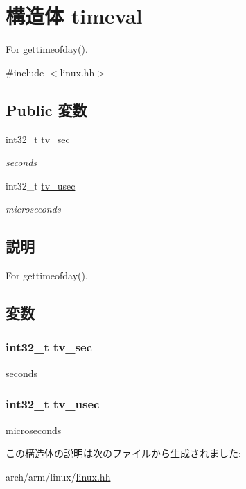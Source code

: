 \hypertarget{structArmLinux32_1_1timeval}{
\section{構造体 timeval}
\label{structArmLinux32_1_1timeval}
}


For gettimeofday().  


{\ttfamily \#include $<$linux.hh$>$}\subsection*{Public 変数}
\begin{DoxyCompactItemize}
\item 
int32\_\-t \hyperlink{structArmLinux32_1_1timeval_a5a0c36f083f4bea01cfe2f60602d30b7}{tv\_\-sec}
\begin{DoxyCompactList}\small\item\em seconds \item\end{DoxyCompactList}\item 
int32\_\-t \hyperlink{structArmLinux32_1_1timeval_a78b854e092076109527b4befb66677a3}{tv\_\-usec}
\begin{DoxyCompactList}\small\item\em microseconds \item\end{DoxyCompactList}\end{DoxyCompactItemize}


\subsection{説明}
For gettimeofday(). 

\subsection{変数}
\hypertarget{structArmLinux32_1_1timeval_a5a0c36f083f4bea01cfe2f60602d30b7}{
\subsubsection[{tv\_\-sec}]{\setlength{\rightskip}{0pt plus 5cm}int32\_\-t {\bf tv\_\-sec}}}
\label{structArmLinux32_1_1timeval_a5a0c36f083f4bea01cfe2f60602d30b7}


seconds \hypertarget{structArmLinux32_1_1timeval_a78b854e092076109527b4befb66677a3}{
\subsubsection[{tv\_\-usec}]{\setlength{\rightskip}{0pt plus 5cm}int32\_\-t {\bf tv\_\-usec}}}
\label{structArmLinux32_1_1timeval_a78b854e092076109527b4befb66677a3}


microseconds 

この構造体の説明は次のファイルから生成されました:\begin{DoxyCompactItemize}
\item 
arch/arm/linux/\hyperlink{arch_2arm_2linux_2linux_8hh}{linux.hh}\end{DoxyCompactItemize}
